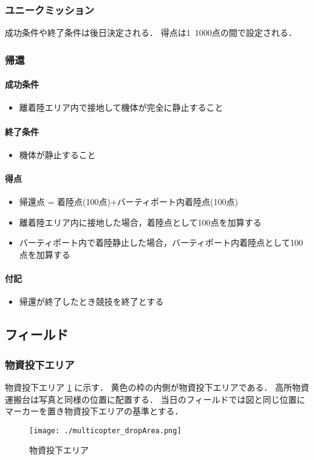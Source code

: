 \subsubsection{ユニークミッション}
成功条件や終了条件は後日決定される．
得点は1~1000点の間で設定される．

\subsubsection{帰還}
\paragraph{成功条件}
\begin{itemize}
\item 離着陸エリア内で接地して機体が完全に静止すること
\end{itemize}
\paragraph{終了条件}
\begin{itemize}
\item 機体が静止すること
\end{itemize}
\paragraph{得点}
\begin{itemize}
\item 帰還点 = 着陸点(100点)+バーティポート内着陸点(100点)
\item 離着陸エリア内に接地した場合，着陸点として100点を加算する
\item バーティポート内で着陸静止した場合，バーティポート内着陸点として100点を加算する
\end{itemize}
\paragraph{付記}
\begin{itemize}
\item 帰還が終了したとき競技を終了とする
\end{itemize}


\subsection{フィールド}
\subsubsection{物資投下エリア}
物資投下エリア \ref{fig::multicopter::dropArea} に示す．
黄色の枠の内側が物資投下エリアである．
高所物資運搬台は写真と同様の位置に配置する．
当日のフィールドでは図と同じ位置にマーカーを置き物資投下エリアの基準とする．
\begin{figure}[ht]
  \centering\texttt{[image: ./multicopter\_dropArea.png]}
  \caption{物資投下エリア}
  \label{fig::multicopter::dropArea}
\end{figure}

